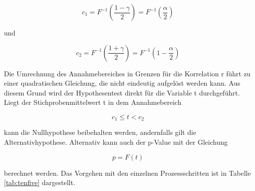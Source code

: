 \begin{equation}\label{eq:tenfifty}
c_{1} =F^{-1} \left(\dfrac{1-\gamma}{2} \right)=F^{-1} \left(\dfrac{\alpha}{2} \right)
\end{equation}

\noindent und

\begin{equation}\label{eq:tenfiftyone}
c_{2} =F^{-1} \left(\dfrac{1+\gamma}{2} \right)=F^{-1} \left(1-\dfrac{\alpha}{2} \right)
\end{equation}

\noindent Die Umrechnung des Annahmebereiches in Grenzen f\"{u}r die Korrelation r f\"{u}hrt zu einer quadratischen Gleichung, die nicht eindeutig aufgel\"{o}st werden kann. Aus diesem Grund wird der Hypothesentest direkt f\"{u}r die Variable t durchgef\"{u}hrt. Liegt der Stichprobenmittelwert t in dem Annahmebereich

\begin{equation}\label{eq:tenfiftytwo}
c_{1} \le t<c_{2}
\end{equation}

\noindent kann die Nullhypothese beibehalten werden, andernfalls gilt die Alternativhypothese. Alternativ kann auch der p-Value mit der Gleichung

\begin{equation}\label{eq:tenfiftythree}
p=F(t)
\end{equation}

\noindent berechnet werden. Das Vorgehen mit den einzelnen Prozessschritten ist in Tabelle \ref{tab:tenfive} dargestellt.

\clearpage

